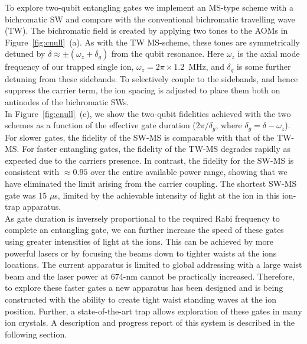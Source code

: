 \documentclass[12pt]{iopart}
\begin{document}
    To explore two-qubit entangling gates we implement an MS-type
    scheme with a bichromatic SW and compare with the conventional
    bichromatic travelling wave (TW). The bichromatic field is created
    by applying two tones to the AOMs in
    Figure~\ref{fig:cnull}~(a). As with the TW MS-scheme, these
    tones are symmetrically detuned by $\delta \approx \pm(\omega_z + \delta_g) $ from the
    qubit resonance. Here $\omega_z$ is the axial mode frequency of
    our trapped single ion, $\omega_z = 2\pi\times 1.2$~MHz, and
    $\delta_g$ is some further detuning from these sidebands. To
    selectively couple to the sidebands, and hence suppress the
    carrier term, the ion spacing is adjusted to place them both on
    antinodes of the bichromatic SWs.\\
    In Figure~\ref{fig:cnull}~(c), we show the two-qubit fidelities
    achieved with the two schemes as a function of the effective gate
    duration ($2\pi/\delta_g$, where
    $\delta_g = \delta - \omega_z$). For slower gates, the fidelity of
    the SW-MS is comparable with that of the TW-MS. For faster
    entangling gates, the fidelity of the TW-MS degrades rapidly as
    expected due to the carriers presence. In contrast, the fidelity
    for the SW-MS is consistent with $\approx 0.95$ over the entire
    available power range, showing that we have eliminated the limit
    arising from the carrier coupling. The shortest SW-MS gate was 15
    $\mu$s, limited by the achievable intensity of light at the ion in
    this ion-trap apparatus.\\ As gate duration is inversely
    proportional to the required Rabi frequency to complete an
    entangling gate, we can further increase the speed of these gates
    using greater intensities of light at the ions. This can be
    achieved by more powerful lasers or by focusing the beams down to
    tighter waists at the ions locations. The current apparatus is
    limited to global addressing with a large waist beam and the laser
    power at 674-nm cannot be practically increased. Therefore, to
    explore these faster gates a new apparatus has been designed and
    is being constructed with the ability to create tight waist
    standing waves at the ion position. Further, a state-of-the-art
    trap allows exploration of these gates in many ion crystals. A
    description and progress report of this system is described in the
    following section.\\
\end{document}
